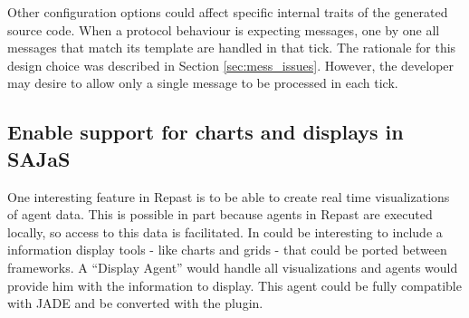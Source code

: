 Other configuration options could affect specific internal traits of the generated source code. When a protocol behaviour is expecting messages, one by one all messages that match its template are handled in that tick. The rationale for this design choice was described in Section \ref{sec:mess_issues}. However, the developer may desire to allow only a single message to be processed in each tick.

\subsection{Enable support for charts and displays in SAJaS}
One interesting feature in Repast is to be able to create real time visualizations of agent data. This is possible in part because agents in Repast are executed locally, so access to this data is facilitated. In could be interesting to include a information display tools - like charts and grids - that could be ported between frameworks. A ``Display Agent'' would handle all visualizations and agents would provide him with the information to display. This agent could be fully compatible with JADE and be converted with the plugin.


